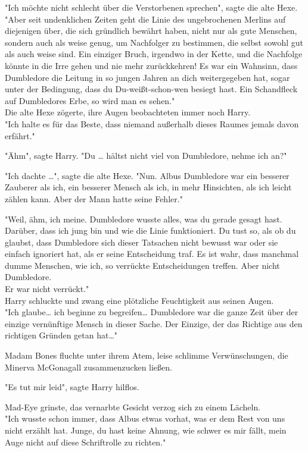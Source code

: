 {"Ich möchte nicht schlecht über die Verstorbenen sprechen", sagte die alte Hexe.\\ "Aber seit undenklichen Zeiten geht die Linie des ungebrochenen Merlins auf diejenigen über, die sich gründlich bewährt haben, nicht nur als gute Menschen, sondern auch als weise genug, um Nachfolger zu bestimmen, die selbst sowohl gut als auch weise sind. Ein einziger Bruch, irgendwo in der Kette, und die Nachfolge könnte in die Irre gehen und nie mehr zurückkehren! Es war ein Wahnsinn, dass Dumbledore die Leitung in so jungen Jahren an dich weitergegeben hat, sogar unter der Bedingung, dass du Du-weißt-schon-wen besiegt hast. Ein Schandfleck auf Dumbledores Erbe, so wird man es sehen."\\ Die alte Hexe zögerte, ihre Augen beobachteten immer noch Harry.\\ "Ich halte es für das Beste, dass niemand außerhalb dieses Raumes jemals davon erfährt."

"Ähm", sagte Harry. "Du … hältst nicht viel von Dumbledore, nehme ich an?"

"Ich dachte …", sagte die alte Hexe. "Nun. Albus Dumbledore war ein besserer Zauberer als ich, ein besserer Mensch als ich, in mehr Hinsichten, als ich leicht zählen kann. Aber der Mann hatte seine Fehler."

"Weil, ähm, ich meine. Dumbledore wusste alles, was du gerade gesagt hast.\\ Darüber, dass ich jung bin und wie die Linie funktioniert. Du tust so, als ob du glaubst, dass Dumbledore sich dieser Tatsachen nicht bewusst war oder sie einfach ignoriert hat, als er seine Entscheidung traf. Es ist wahr, dass manchmal dumme Menschen, wie ich, so verrückte Entscheidungen treffen. Aber nicht Dumbledore.\\ Er war nicht verrückt."\\ Harry schluckte und zwang eine plötzliche Feuchtigkeit aus seinen Augen.\\ "Ich glaube… ich beginne zu begreifen… Dumbledore war die ganze Zeit über der einzige vernünftige Mensch in dieser Sache. Der Einzige, der das Richtige aus den richtigen Gründen getan hat…"

Madam Bones fluchte unter ihrem Atem, leise schlimme Verwünschungen, die Minerva McGonagall zusammenzucken ließen.

"Es tut mir leid", sagte Harry hilflos.

Mad-Eye grinste, das vernarbte Gesicht verzog sich zu einem Lächeln.\\ "Ich wusste schon immer, dass Albus etwas vorhat, was er dem Rest von uns nicht erzählt hat. Junge, du hast keine Ahnung, wie schwer es mir fällt, mein Auge nicht auf diese Schriftrolle zu richten."

}
